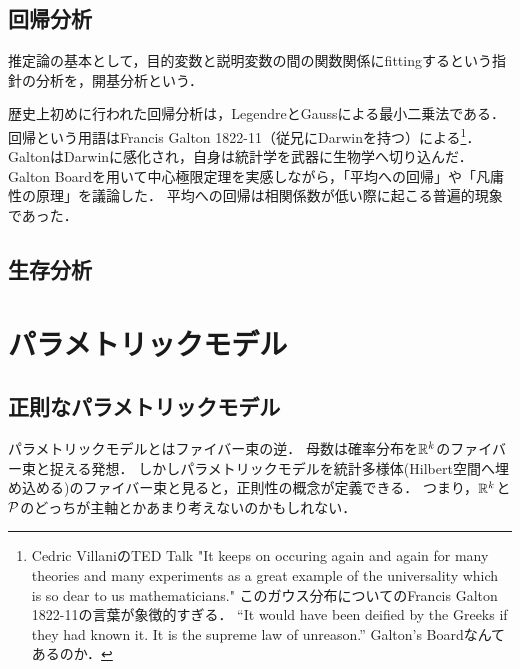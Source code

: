 \documentclass[uplatex,dvipdfmx]{jsreport}
\begin{document}
\section{回帰分析}

\begin{tcolorbox}[colframe=ForestGreen, colback=ForestGreen!10!white,breakable,colbacktitle=ForestGreen!40!white,coltitle=black,fonttitle=\bfseries\sffamily,
title=]
    推定論の基本として，目的変数と説明変数の間の関数関係にfittingするという指針の分析を，開基分析という．
\end{tcolorbox}

\begin{history}
    歴史上初めに行われた回帰分析は，LegendreとGaussによる最小二乗法である．
    回帰という用語はFrancis Galton 1822-11（従兄にDarwinを持つ）による\footnote{Cedric VillaniのTED Talk "It keeps on occuring again and again for many theories and many experiments as a great example of the universality which is so dear to us mathematicians."
    このガウス分布についてのFrancis Galton 1822-11の言葉が象徴的すぎる．
    “It would have been deified by the Greeks if they had known it. It is the supreme law of unreason.”
    Galton’s Boardなんてあるのか．}．
    GaltonはDarwinに感化され，自身は統計学を武器に生物学へ切り込んだ．Galton Boardを用いて中心極限定理を実感しながら，「平均への回帰」や「凡庸性の原理」を議論した．
    平均への回帰は相関係数が低い際に起こる普遍的現象であった．
\end{history}

\section{生存分析}

\chapter{パラメトリックモデル}

\section{正則なパラメトリックモデル}

\begin{tcolorbox}[colframe=ForestGreen, colback=ForestGreen!10!white,breakable,colbacktitle=ForestGreen!40!white,coltitle=black,fonttitle=\bfseries\sffamily,
title=]
    パラメトリックモデルとはファイバー束の逆．
    母数は確率分布を$\R^k$のファイバー束と捉える発想．
    しかしパラメトリックモデルを統計多様体(Hilbert空間へ埋め込める)のファイバー束と見ると，正則性の概念が定義できる．
    つまり，$\R^k$と$\P$のどっちが主軸とかあまり考えないのかもしれない．
\end{tcolorbox}
\end{document}
